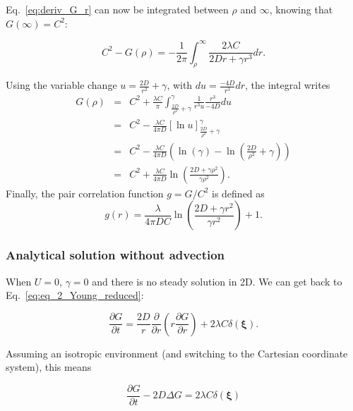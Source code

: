 Eq.~\ref{eq:deriv_G_r} can now be integrated between $\rho$ and $\infty$, knowing that $G(\infty)=C^{2}$:

\begin{equation}
 C^{2}-G(\rho) = -\frac{1}{2\pi}{\displaystyle \int_{\rho}^{\infty}}\frac{2\lambda C}{2Dr+\gamma r^{3}}dr.\label{eq:deriv_G_r_int1}
\end{equation}

Using the variable change $u=\frac{2D}{r^{2}}+\gamma$, with $du=\frac{-4D}{r^{3}}dr$,
the integral writes
\begin{equation}
\begin{array}{ccc}
G(\rho) & = & C^{2}+\frac{\lambda C}{\pi}{\displaystyle \int_{\frac{2D}{\rho^{2}}+\gamma}^{\gamma}}\frac{1}{r^{3}u}\frac{r^{3}}{-4D}du\\
 & = & C^{2}-\frac{\lambda C}{4\pi D}\left[\ln u\right]_{\frac{2D}{\rho^{2}}+\gamma}^{\gamma}\\
 & = & C^{2}-\frac{\lambda C}{4\pi D}\left(\ln(\gamma)-\ln\left(\frac{2D}{\rho^{2}}+\gamma\right)\right)\\
 & = & C^{2}+\frac{\lambda C}{4\pi D}\ln\left(\frac{2D+\gamma \rho^{2}}{\gamma \rho^{2}}\right).
\end{array}
\end{equation}
Finally, the pair correlation function $g=G/C^{2}$ is defined as
\begin{equation}
g(r)=\frac{\lambda}{4\pi DC}\ln\left(\frac{2D+\gamma r^{2}}{\gamma r^{2}}\right)+1.
\end{equation}

\subsubsection*{Analytical solution without advection}

When $U=0$, $\gamma=0$ and there is no steady solution in 2D. We can get back to Eq.~\ref{eq:eq_2_Young_reduced}:

\begin{equation}
\frac{\partial G}{\partial t}=\frac{2D}{r}\frac{\partial}{\partial r}\left(r\frac{\partial G}{\partial r}\right)+2\lambda C\delta(\boldsymbol{\xi}).\label{eq:g_without_advection}
\end{equation}

Assuming an isotropic environment (and switching to the Cartesian coordinate system), this means

\begin{equation}
\frac{\partial G}{\partial t}-2D\Delta G=2\lambda C\delta(\boldsymbol{\xi})
\end{equation}

